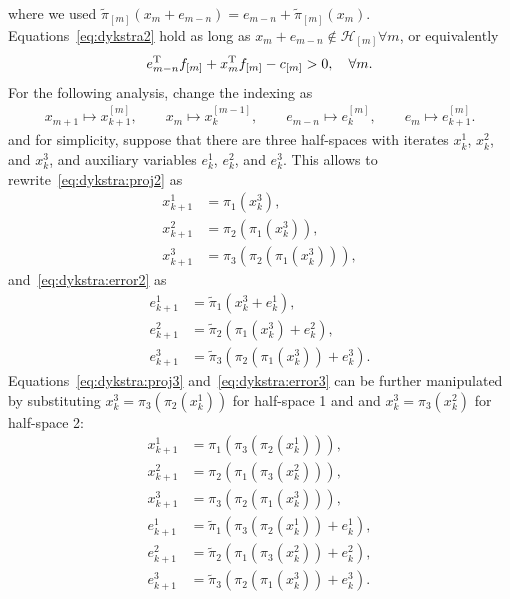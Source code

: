 \documentclass[hidelinks]{article}
\begin{document}
where we used $\tilde{\pi}_{[m]}(x_{m}+e_{m-n})=e_{m-n}+\tilde{\pi}_{[m]}(x_{m})$. Equations~\eqref{eq:dykstra2} hold as long as $x_m+e_{m-n}\not\in\mathcal{H}_{[m]}\forall m$, or equivalently
\begin{align}\label{eq:switch}
e_{m-n}^{\text{T}} f_{[m]}+x_m^{\text{T}} f_{[m]}-c_{[m]} > 0, \quad\forall m.
\end{align}
For the following analysis, change the indexing as
\begin{align}
x_{m+1} \mapsto x_{k+1}^{[m]},\qquad x_{m} \mapsto x_{k}^{[m-1]},\qquad
e_{m-n} \mapsto e_{k}^{[m]},\qquad e_{m} \mapsto e_{k+1}^{[m]}.
\end{align}
and for simplicity, suppose that there are three half-spaces with iterates $x_k^1$, $x_k^2$, and $x_k^3$, and auxiliary variables $e_k^1$, $e_k^2$, and $e_k^3$. This allows to rewrite~\eqref{eq:dykstra:proj2} as
\begin{subequations}
\begin{align}
x_{k+1}^1 &= \pi_1(x_k^3),\\
x_{k+1}^2 &= \pi_2(\pi_1(x_k^3)),\\
x_{k+1}^3 &= \pi_3(\pi_2(\pi_1(x_k^3))),
\end{align}\label{eq:dykstra:proj3}
\end{subequations}
and~\eqref{eq:dykstra:error2} as
\begin{subequations}
\begin{align}
e_{k+1}^1 &= \tilde{\pi}_1(x_k^3+e_k^1),\\
e_{k+1}^2 &= \tilde{\pi}_2(\pi_1(x_k^3)+e_k^2),\\
e_{k+1}^3 &= \tilde{\pi}_3(\pi_2(\pi_1(x_k^3))+e_k^3).
\end{align}\label{eq:dykstra:error3}
\end{subequations}
Equations~\eqref{eq:dykstra:proj3} and~\eqref{eq:dykstra:error3} can be further manipulated by substituting $x_k^3=\pi_3(\pi_2(x_k^1))$ for half-space 1 and and $x_k^3=\pi_3(x_k^2)$ for half-space 2:
\begin{subequations}
\begin{align}
x_{k+1}^1 &= \pi_1(\pi_3(\pi_2(x_k^1))),\\
x_{k+1}^2 &= \pi_2(\pi_1(\pi_3(x_k^2))),\\
x_{k+1}^3 &= \pi_3(\pi_2(\pi_1(x_k^3))),\\
e_{k+1}^1 &= \tilde{\pi}_1(\pi_3(\pi_2(x_k^1))+e_k^1),\\
e_{k+1}^2 &= \tilde{\pi}_2(\pi_1(\pi_3(x_k^2))+e_k^2),\\
e_{k+1}^3 &= \tilde{\pi}_3(\pi_2(\pi_1(x_k^3))+e_k^3).
\end{align}\label{eq:dykstra4}
\end{subequations}
\end{document}
